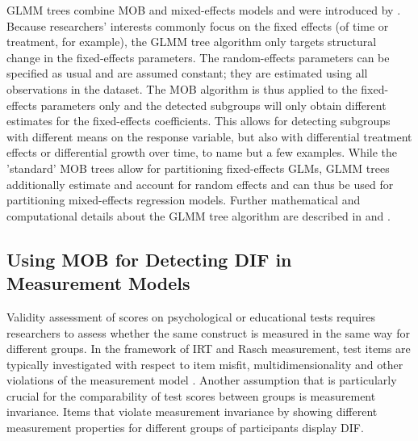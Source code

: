 \documentclass[doc,floatsintext,natbib]{apa7}
\begin{document}
GLMM trees combine MOB and mixed-effects models and were introduced by \cite{FokkySmit18}. Because researchers' interests commonly focus on the fixed effects (of time or treatment, for example), the GLMM tree algorithm only targets structural change in the fixed-effects parameters. The random-effects parameters can be specified as usual and are assumed constant; they are estimated using all observations in the dataset. The MOB algorithm is thus applied to the fixed-effects parameters only and the detected subgroups will only obtain different estimates for the fixed-effects coefficients. This allows for detecting subgroups with different means on the response variable, but also with differential treatment effects or differential growth over time, to name but a few examples. While the 'standard' MOB trees \cite{ZeilyHoth08} allow for partitioning fixed-effects GLMs, GLMM trees additionally estimate and account for random effects and can thus be used for partitioning mixed-effects regression models. Further mathematical and computational details about the GLMM tree algorithm are described in \cite{FokkySmit18} and \citep{FokkyZeil23}. 



\subsection{Using MOB for Detecting DIF in Measurement Models}

Validity assessment of scores on psychological or educational tests requires researchers to assess whether the same construct is measured in the same way for different groups. In the framework of IRT and Rasch measurement, test items are typically investigated with respect to item misfit, multidimensionality and other violations of the measurement model \citep[cf., e.g.,][for an introduction]{DebStrZei:2022:CRC}.  Another assumption that is particularly crucial for the comparability of test scores between groups is measurement invariance. Items that violate measurement invariance by showing different measurement properties for different groups of participants display DIF.
\end{document}
